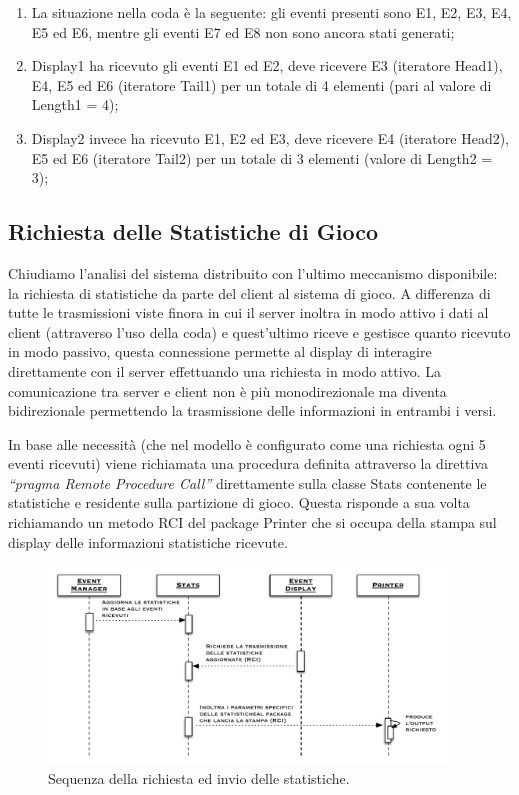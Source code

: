 \documentclass[aps,letterpaper,10pt]{article}
\begin{document}
\begin{enumerate}
	\item La situazione nella coda \`e la seguente: gli eventi presenti sono E1, E2, E3, E4, E5 ed E6, mentre gli eventi E7 ed E8 non sono ancora stati generati; 
	\item Display1 ha ricevuto gli eventi E1 ed E2, deve ricevere E3 (iteratore Head1), E4, E5 ed E6 (iteratore Tail1) per un totale di 4 elementi (pari al valore di Length1 = 4);
	\item Display2 invece ha ricevuto E1, E2 ed E3, deve ricevere E4 (iteratore Head2), E5 ed E6 (iteratore Tail2) per un totale di 3 elementi (valore di Length2 = 3);
\end{enumerate}

\subsection{Richiesta delle Statistiche di Gioco}

Chiudiamo l'analisi del sistema distribuito con l'ultimo meccanismo disponibile: la richiesta di statistiche da parte del client al sistema di gioco. A differenza di tutte le trasmissioni viste finora in cui il server inoltra in modo attivo i dati al client (attraverso l'uso della coda) e quest'ultimo riceve e gestisce quanto ricevuto in modo passivo, questa connessione permette al display di interagire direttamente con il server effettuando una richiesta in modo attivo. La comunicazione tra server e client non \`e pi\`u monodirezionale ma diventa bidirezionale permettendo la trasmissione delle informazioni in entrambi i versi. \vspace{3mm}

In base alle necessit\`a (che nel modello \`e configurato come una richiesta ogni 5 eventi ricevuti) viene richiamata una procedura definita attraverso la direttiva \emph{``pragma Remote Procedure Call''} direttamente sulla classe Stats contenente le statistiche e residente sulla partizione di gioco. Questa risponde a sua volta richiamando un metodo RCI del package Printer che si occupa della stampa sul display delle informazioni statistiche ricevute.

\begin{figure}[H]
	\begin{center}
		\includegraphics[width=400px]{images/stats-sequence.pdf}
	\end{center}
\caption{Sequenza della richiesta ed invio delle statistiche.}
\end{figure}
\end{document}
